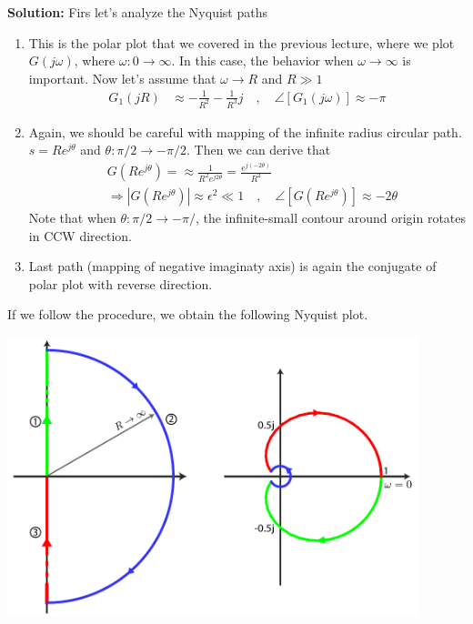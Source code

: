 \documentclass[twoside]{article}
\begin{document}
\textbf{Solution:} Firs let's analyze the Nyquist paths
%
\begin{enumerate}
  \item This is the polar plot that we covered in the previous
    lecture, where we plot $G(j \omega)$, where $\omega : 0 \to
    \infty$. In this case, the behavior when $\omega \to \infty$ is
    important. Now let's assume that $\omega \to R$ and $R \gg 1$
  \begin{align*}
   G_1(j R) &\approx -\frac{1}{R^2} - \frac{1}{R^3} j
    \quad , \quad 
    \angle [ G_1(j \omega) ] \approx -\pi
   \end{align*}
%
  \item Again, we should be careful with mapping of  the infinite radius
    circular path. $s = R e^{j \theta}$ and $\theta : \pi/2 \to -\pi/2$.  Then 
   we can derive that  
   \begin{align*}
     & G \left( R e^{j \theta} \right) = \approx \frac{1}{R^2 e^{j
       2 \theta}} = \frac{e^{j (-2 \theta)}}{R^2}
       \\
    &\Rightarrow | G \left( R e^{j \theta} \right) | \approx
      \epsilon^2 \ll 1
   \quad , \quad \angle [ G \left( R e^{j \theta} \right) ] \approx -2
      \theta
   \end{align*}
   Note that when $\theta : \pi/2 \to -\pi/$, the infinite-small 
   contour around origin rotates in CCW direction. 
   \item Last path (mapping of negative imaginaty axis) is again
   the conjugate of polar plot with reverse direction. 
\end{enumerate}

If we follow the procedure, we obtain the following Nyquist plot. 

\vspace{6 pt}

  \begin{minipage}[h]{1\linewidth}
    \begin{center}
      \includegraphics[width=0.9\textwidth]{ex3}
    \end{center}
  \end{minipage}
\end{document}
